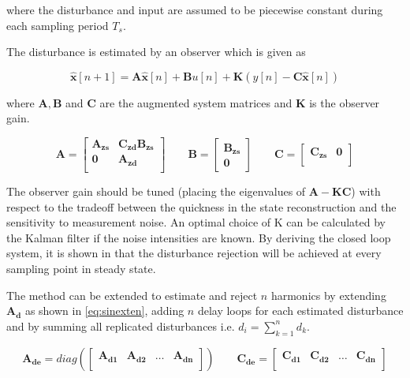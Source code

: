 where the disturbance and input are assumed to be piecewise constant during each sampling period $T_s$.

The disturbance is estimated by an observer which is given as

\begin{equation}
  \label{eq:obs}
  \mathbf{\hat{x}}[n + 1] = \mathbf{A\hat{x}}[n] + \mathbf{B}u[n] + \mathbf{K}(y[n] - \mathbf{C\hat{x}}[n])
\end{equation}

where $\mathbf{A, B}$ and $\mathbf{C}$ are the augmented system matrices and $\mathbf{K}$ is the observer gain.

\begin{equation}
  \label{eq:augumented}
  \mathbf{A} =
    \begin{bmatrix}
       \mathbf{A_{zs}} & \mathbf{C_{zd}B_{zs}}\\[0.3em]
       \mathbf{0} & \mathbf{A_{zd}}\\
     \end{bmatrix}
     \qquad
  \mathbf{B} =
    \begin{bmatrix}
        \mathbf{B_{zs}}\\
        \mathbf{0}
    \end{bmatrix}
     \qquad
  \mathbf{C} =
    \begin{bmatrix}
        \mathbf{C_{zs}} & \mathbf{0}\\
    \end{bmatrix}
\end{equation}

The observer gain should be tuned (placing the eigenvalues of $\mathbf{A-KC}$) with respect to the tradeoff between the quickness in the state reconstruction and the sensitivity to measurement noise. An optimal choice of K can be calculated by the Kalman filter if the noise intensities are known. By deriving the closed loop system, it is shown in \citep{fujimoto2004repetitive} that the disturbance rejection will be achieved at every sampling point in steady state.

The method can be extended to estimate and reject $n$ harmonics by extending $\mathbf{A_d}$ as shown in \eqref{eq:sinexten}, adding $n$ delay loops for each estimated disturbance and by summing all replicated disturbances i.e. $d_i = \sum_{k=1}^{n} d_k$.

\begin{equation}
  \label{eq:sinexten}
  \mathbf{A_{de}} =
    diag(\begin{bmatrix}
      \mathbf{A_{d1}}  &  \mathbf{A_{d2}} & \hdots & \mathbf{A_{dn}} \\
     \end{bmatrix})
     \qquad
  \mathbf{C_{de}} =
    \begin{bmatrix}
       \mathbf{C_{d1}}  &  \mathbf{C_{d2}} & \hdots & \mathbf{C_{dn}} \\
    \end{bmatrix}
\end{equation}

